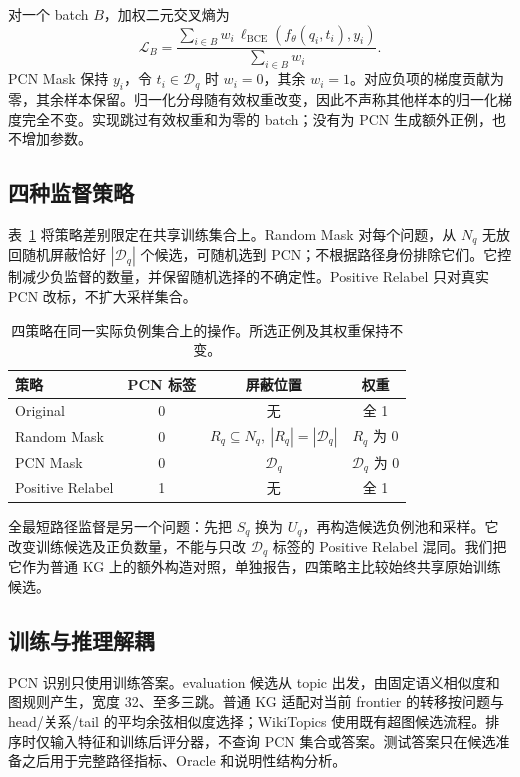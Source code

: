 \documentclass[UTF8,a4paper,10pt,fontset=fandol]{ctexart}
\newcommand{\pcn}{\mathcal D_q}
\begin{document}
对一个 batch $B$，加权二元交叉熵为
\begin{equation}
\mathcal L_B=\frac{\sum_{i\in B}w_i\,\ell_{\mathrm{BCE}}(f_\theta(q_i,t_i),y_i)}{\sum_{i\in B}w_i}.
\label{eq:loss}
\end{equation}
PCN Mask 保持 $y_i$，令 $t_i\in\pcn$ 时 $w_i=0$，其余 $w_i=1$。对应负项的梯度贡献为零，其余样本保留。归一化分母随有效权重改变，因此不声称其他样本的归一化梯度完全不变。实现跳过有效权重和为零的 batch；没有为 PCN 生成额外正例，也不增加参数。

\subsection{四种监督策略}
表~\ref{tab:strategies} 将策略差别限定在共享训练集合上。Random Mask 对每个问题，从 $N_q$ 无放回随机屏蔽恰好 $|\pcn|$ 个候选，可随机选到 PCN；不根据路径身份排除它们。它控制减少负监督的数量，并保留随机选择的不确定性。Positive Relabel 只对真实 PCN 改标，不扩大采样集合。

\begin{table}[tbp]\centering
\caption{四策略在同一实际负例集合上的操作。所选正例及其权重保持不变。}\label{tab:strategies}
\begin{tabular}{lccc}\toprule
策略 & PCN 标签 & 屏蔽位置 & 权重 \\\midrule
Original & 0 & 无 & 全 1 \\
Random Mask & 0 & $R_q\subseteq N_q,\ |R_q|=|\pcn|$ & $R_q$ 为 0 \\
PCN Mask & 0 & $\pcn$ & $\pcn$ 为 0 \\
Positive Relabel & 1 & 无 & 全 1 \\\bottomrule
\end{tabular}
\end{table}

全最短路径监督是另一个问题：先把 $S_q$ 换为 $U_q$，再构造候选负例池和采样。它改变训练候选及正负数量，不能与只改 $\pcn$ 标签的 Positive Relabel 混同。我们把它作为普通 KG 上的额外构造对照，单独报告，四策略主比较始终共享原始训练候选。

\subsection{训练与推理解耦}
PCN 识别只使用训练答案。evaluation 候选从 topic 出发，由固定语义相似度和图规则产生，宽度 32、至多三跳。普通 KG 适配对当前 frontier 的转移按问题与 head/关系/tail 的平均余弦相似度选择；WikiTopics 使用既有超图候选流程。排序时仅输入特征和训练后评分器，不查询 PCN 集合或答案。测试答案只在候选准备之后用于完整路径指标、Oracle 和说明性结构分析。
\end{document}
